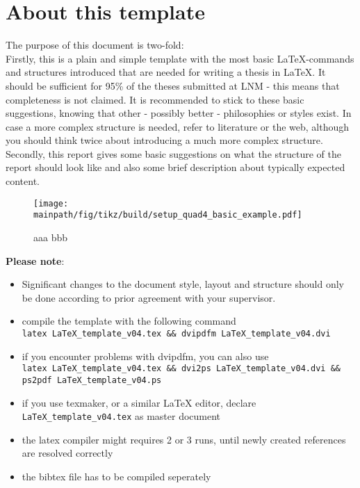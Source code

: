 \documentclass[../main.tex]{subfiles}
\begin{document}
\section{About this template}
\label{cha:about}

The purpose of this document is two-fold:\\
Firstly, this is a plain and simple template with the most basic \LaTeX-commands and
structures introduced that are
needed for writing a thesis in \LaTeX. It should be sufficient for 95\% of
the theses submitted at LNM - this means that completeness is not claimed. It is recommended to
stick to these basic suggestions, knowing that other - possibly better -
philosophies or styles exist. In case a more complex structure is needed, refer to literature or the web, although you should think
twice about introducing a much more complex structure. \\
Secondly, this report gives some basic suggestions on what the structure of the report should look like and also some brief description about typically expected content.\\

\begin{figure}[h!]
	\begin{center}
	    \texttt{[image: \\mainpath/fig/tikz/build/setup\_quad4\_basic\_example.pdf]}
        \caption[aaa]{aaa bbb}
		\label{aaa}
    \end{center}
\end{figure}

%
%

\textbf{Please note}: 
\begin{itemize}
 \item Significant changes to the document style, layout and structure should only be done according to prior agreement with your supervisor.
 \item compile the template with the following command \\
 \verb|latex LaTeX_template_v04.tex && dvipdfm LaTeX_template_v04.dvi|
 \item if you encounter problems with dvipdfm, you can also use \\
 \verb|latex LaTeX_template_v04.tex && dvi2ps LaTeX_template_v04.dvi &&|\\
 \verb|ps2pdf LaTeX_template_v04.ps| \\
 \item if you use texmaker, or a similar LaTeX editor, declare \verb|LaTeX_template_v04.tex| as master document   \\
 \item the latex compiler might requires 2 or 3 runs, until newly created references are resolved correctly \\
 \item the bibtex file has to be compiled seperately
\end{itemize}
\end{document}
